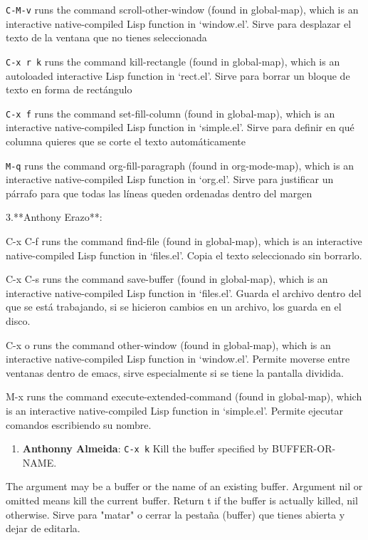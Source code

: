 \documentclass{article}
\begin{document}
\texttt{C-M-v} runs the command scroll-other-window (found in global-map),
which is an interactive native-compiled Lisp function in ‘window.el’.
Sirve para desplazar el texto de la ventana que no tienes seleccionada

\texttt{C-x r k} runs the command kill-rectangle (found in global-map), which
is an autoloaded interactive Lisp function in ‘rect.el’.
Sirve para borrar un bloque de texto en forma de rectángulo

\texttt{C-x f} runs the command set-fill-column (found in global-map), which is
an interactive native-compiled Lisp function in ‘simple.el’.
Sirve para definir en qué columna quieres que se corte el texto automáticamente

\texttt{M-q} runs the command org-fill-paragraph (found in org-mode-map), which
is an interactive native-compiled Lisp function in ‘org.el’.
Sirve para justificar un párrafo para que todas las líneas queden ordenadas dentro del margen


3.**Anthony Erazo**:

C-x C-f runs the command find-file (found in global-map), which is an
interactive native-compiled Lisp function in ‘files.el’.
Copia el texto seleccionado sin borrarlo.

C-x C-s runs the command save-buffer (found in global-map), which is
an interactive native-compiled Lisp function in ‘files.el’.
Guarda el archivo dentro del que se está trabajando, si se hicieron cambios en un archivo, los guarda en el disco. 

C-x o runs the command other-window (found in global-map), which is an
interactive native-compiled Lisp function in ‘window.el’.
Permite moverse entre ventanas dentro de emacs, sirve especialmente si se tiene la pantalla dividida. 

M-x runs the command execute-extended-command (found in global-map),
which is an interactive native-compiled Lisp function in ‘simple.el’.
Permite ejecutar comandos escribiendo su nombre.

\begin{enumerate}
\item \textbf{\textbf{Anthonny Almeida}}:
\texttt{C-x k} Kill the buffer specified by BUFFER-OR-NAME.
\end{enumerate}
The argument may be a buffer or the name of an existing buffer.
Argument nil or omitted means kill the current buffer.  Return t if the
buffer is actually killed, nil otherwise.
Sirve para "matar" o cerrar la pestaña (buffer) que tienes abierta y dejar de editarla.
\end{document}
